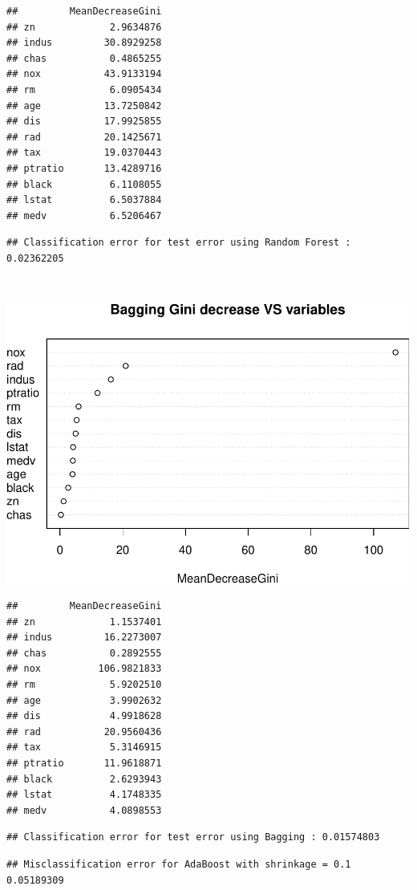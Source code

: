 \documentclass[]{article}
\begin{document}
\begin{verbatim}
##         MeanDecreaseGini
## zn             2.9634876
## indus         30.8929258
## chas           0.4865255
## nox           43.9133194
## rm             6.0905434
## age           13.7250842
## dis           17.9925855
## rad           20.1425671
## tax           19.0370443
## ptratio       13.4289716
## black          6.1108055
## lstat          6.5037884
## medv           6.5206467
\end{verbatim}

\begin{verbatim}
## Classification error for test error using Random Forest :  0.02362205
\end{verbatim}

~

\includegraphics{HW4_Solution_files/figure-latex/unnamed-chunk-16-1.pdf}

\begin{verbatim}
##         MeanDecreaseGini
## zn             1.1537401
## indus         16.2273007
## chas           0.2892555
## nox          106.9821833
## rm             5.9202510
## age            3.9902632
## dis            4.9918628
## rad           20.9560436
## tax            5.3146915
## ptratio       11.9618871
## black          2.6293943
## lstat          4.1748335
## medv           4.0898553
\end{verbatim}

\begin{verbatim}
## Classification error for test error using Bagging : 0.01574803
\end{verbatim}

\begin{verbatim}
## Misclassification error for AdaBoost with shrinkage = 0.1 0.05189309
\end{verbatim}
\end{document}
